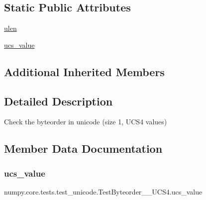 \subsection*{Static Public Attributes}
\begin{DoxyCompactItemize}
\item 
\hyperlink{classnumpy_1_1core_1_1tests_1_1test__unicode_1_1TestByteorder__1__UCS4_a0d1e91f0401989f1c28c7e05bc632794}{ulen}
\item 
\hyperlink{classnumpy_1_1core_1_1tests_1_1test__unicode_1_1TestByteorder__1__UCS4_ae09f86d9bae25ea64bb90b53afe6a4cb}{ucs\+\_\+value}
\end{DoxyCompactItemize}
\subsection*{Additional Inherited Members}


\subsection{Detailed Description}
\begin{DoxyVerb}Check the byteorder in unicode (size 1, UCS4 values)\end{DoxyVerb}
 

\subsection{Member Data Documentation}
\mbox{\label{classnumpy_1_1core_1_1tests_1_1test__unicode_1_1TestByteorder__1__UCS4_ae09f86d9bae25ea64bb90b53afe6a4cb}} 
\subsubsection{\texorpdfstring{ucs\+\_\+value}{ucs\_value}}
{\footnotesize\ttfamily numpy.\+core.\+tests.\+test\+\_\+unicode.\+Test\+Byteorder\+\_\+\_\+\+U\+C\+S4.\+ucs\+\_\+value\hspace{0.3cm}{\ttfamily [static]}}

